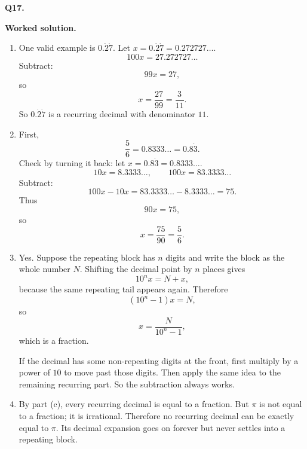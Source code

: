 \documentclass[12pt,a4paper]{article}
\newcommand{\wsol}{%
  \par\smallskip
  \noindent\textbf{\color{blue!50!black}Worked solution.}\space}
\begin{document}
\medskip
\noindent\textbf{Q17.}
\wsol
\begin{enumerate}[label=(\alph*),leftmargin=*]
\item One valid example is $0.\dot{2}\dot{7}$.
Let $x=0.\dot{2}\dot{7}=0.272727\ldots$.
\[
100x=27.272727\ldots
\]
Subtract:
\[
99x=27,
\]
so
\[
x=\frac{27}{99}=\frac{3}{11}.
\]
So $0.\dot{2}\dot{7}$ is a recurring decimal with denominator $11$.

\item First,
\[
\frac56=0.8333\ldots=0.8\dot{3}.
\]
Check by turning it back: let $x=0.8\dot{3}=0.8333\ldots$.
\[
10x=8.3333\ldots,\qquad 100x=83.3333\ldots
\]
Subtract:
\[
100x-10x=83.3333\ldots-8.3333\ldots=75.
\]
Thus
\[
90x=75,
\]
so
\[
x=\frac{75}{90}=\frac56.
\]

\item Yes. Suppose the repeating block has $n$ digits and write the block as the whole number $N$. Shifting the decimal point by $n$ places gives
\[
10^n x=N+x,
\]
because the same repeating tail appears again. Therefore
\[
(10^n-1)x=N,
\]
so
\[
x=\frac{N}{10^n-1},
\]
which is a fraction.

If the decimal has some non-repeating digits at the front, first multiply by a power of $10$ to move past those digits. Then apply the same idea to the remaining recurring part. So the subtraction always works.

\item By part (c), every recurring decimal is equal to a fraction. But $\pi$ is not equal to a fraction; it is irrational. Therefore no recurring decimal can be exactly equal to $\pi$. Its decimal expansion goes on forever but never settles into a repeating block.
\end{enumerate}
\end{document}
